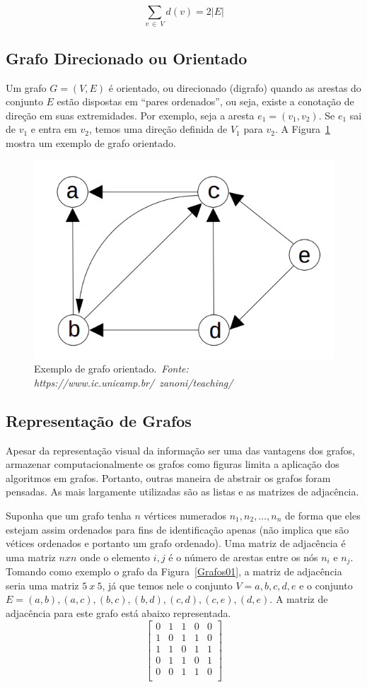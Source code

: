 \documentclass[11pt,fleqn]{book} %
\begin{document}
$$ \sum_{v~\in~V} d(v) = 2|E| $$


\subsection{Grafo Direcionado ou Orientado}
Um grafo $G = (V, E)$ é orientado, ou direcionado (digrafo) quando as arestas do conjunto $E$ estão dispostas em ``pares ordenados'', ou seja, existe a conotação de direção em suas extremidades.
Por exemplo, seja a aresta $e_1 = (v_1, v_2)$. Se $e_1$ sai de $v_1$ e entra em $v_2$, temos uma direção definida de $V_1$ para $v_2$.
A Figura~\ref{Grafos05} mostra um exemplo de grafo orientado.
\begin{figure}[htbp]
	\centering
	\includegraphics[width=.35\textwidth]{Pictures/Grafos05}
	\caption[Exemplo de grafo orientado.]{Exemplo de grafo orientado.~\textit{Fonte: https://www.ic.unicamp.br/~zanoni/teaching/}}
	\label{Grafos05}
\end{figure}

\subsection{Representação de Grafos}
Apesar da representação visual da informação ser uma das vantagens dos grafos, armazenar computacionalmente os grafos como figuras limita a aplicação dos algoritmos em grafos.
Portanto, outras maneira de abstrair os grafos foram pensadas. 
As mais largamente utilizadas são as listas e as matrizes de adjacência.

Suponha que um grafo tenha $n$ vértices numerados $n_1, n_2, \dots, n_n$ de forma que eles estejam assim ordenados para fins de identificação apenas (não implica que são vétices ordenados e portanto um grafo ordenado).
Uma matriz de adjacência é uma matriz $n x n$ onde o elemento $i, j$ é o número de arestas entre os nós $n_i$ e $n_j$.
Tomando como exemplo o grafo da Figura~\ref{Grafos01}, a matriz de adjacência seria uma matriz $5~x~5$, já que temos nele o conjunto $V = {a, b, c, d, e}$ e o conjunto $E = {(a, b),(a, c),(b, c),(b, d),(c, d),(c, e),(d, e)}$. 
A matriz de adjacência para este grafo está abaixo representada.
$$\begin{bmatrix}
0 & 1 & 1 & 0 & 0 \\
1 & 0 & 1 & 1 & 0 \\
1 & 1 & 0 & 1 & 1 \\
0 & 1 & 1 & 0 & 1 \\
0 & 0 & 1 & 1 & 0 \\
\end{bmatrix}$$
\end{document}
